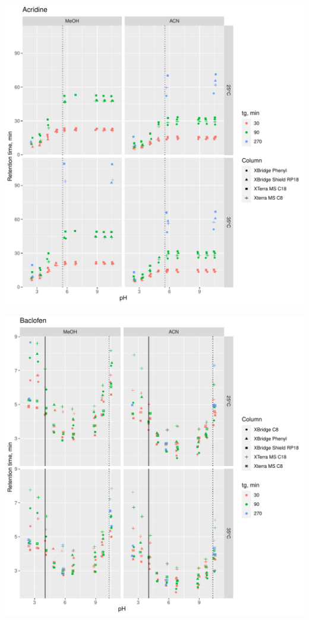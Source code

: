\documentclass[
]{article}
\begin{document}
\includegraphics{../figures/rawdata/Acridine.pdf}

\newpage{}

\includegraphics{../figures/rawdata/Baclofen.pdf}
\end{document}

